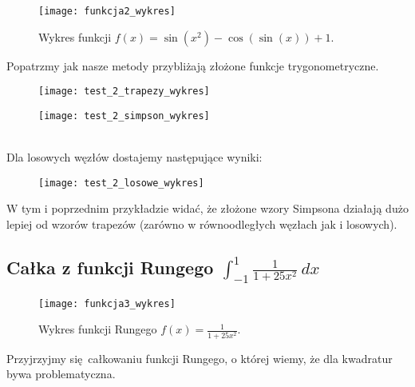 \documentclass{article}
\begin{document}
\begin{figure}[h!]
\centering
\texttt{[image: funkcja2\_wykres]}
\caption{Wykres funkcji $f(x) = \sin(x^2) - \cos(\sin(x)) + 1$.}	
\end{figure}

Popatrzmy jak nasze metody przybliżają złożone funkcje trygonometryczne.


  \begin{minipage}{\linewidth}
      \centering
      \begin{minipage}{0.35\linewidth}
          \begin{figure}[H]
              \texttt{[image: test\_2\_trapezy\_wykres]}
          \end{figure}
      \end{minipage}
      \hspace{0.05\linewidth}
      \begin{minipage}{0.35\linewidth}
          \begin{figure}[H]
              \texttt{[image: test\_2\_simpson\_wykres]}
          \end{figure}
      \end{minipage}
  \end{minipage}\\


Dla losowych węzłów dostajemy następujące wyniki:

\begin{figure}[h!]
\centering
\texttt{[image: test\_2\_losowe\_wykres]}
\end{figure}

W tym i poprzednim przykładzie widać, że złożone wzory Simpsona działają dużo lepiej od wzorów trapezów (zarówno w równoodległych węzłach jak i losowych).
\pagebreak



\subsection{Całka z funkcji Rungego $\int_{-1}^{1} \frac{1}{1+25x^2} \ dx$ }


\begin{figure}[h!]
\centering
\texttt{[image: funkcja3\_wykres]}
\caption{Wykres funkcji Rungego $f(x) = \frac{1}{1+25x^2}$.}	
\end{figure}

Przyjrzyjmy się całkowaniu funkcji Rungego, o której wiemy, że dla kwadratur bywa problematyczna.
\end{document}
